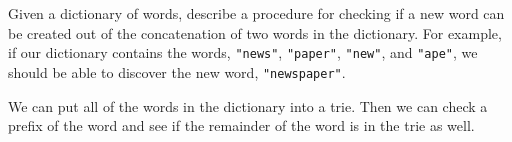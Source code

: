 \question Given a dictionary of words, describe a procedure for checking if a new word can be created out of the concatenation of two words in the dictionary. For example, if our dictionary contains the words, \texttt{"news"}, \texttt{"paper"}, \texttt{"new"}, and \texttt{"ape"}, we should be able to discover the new word, \texttt{"newspaper"}.

\begin{solution}[0.75in]
We can put all of the words in the dictionary into a trie. Then we can check a prefix of the word and see if the remainder of the word is in the trie as well.
\end{solution}